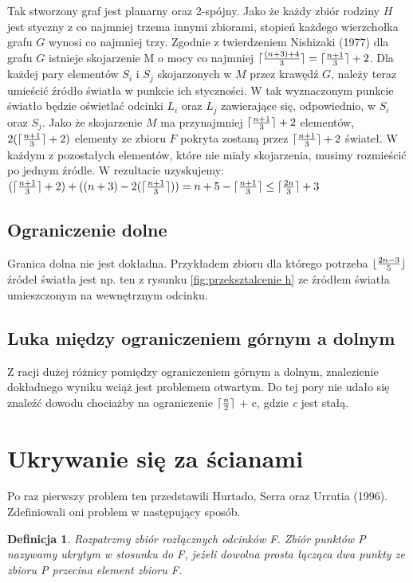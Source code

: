 \documentclass[brudnopis]{xmgr}
\DeclarePairedDelimiter\ceil{\lceil}{\rceil}
\DeclarePairedDelimiter\floor{\lfloor}{\rfloor}
\newtheorem{Definicja}{Definicja} \theoremstyle{definition}
\begin{document}
Tak stworzony graf jest planarny oraz 2-spójny. Jako że każdy zbiór rodziny $H$ jest styczny z co najmniej trzema innymi zbiorami, stopień każdego wierzchołka grafu $G$ wynosi co najmniej trzy. Zgodnie z twierdzeniem Nishizaki (1977) dla grafu $G$ istnieje skojarzenie M o mocy co najmniej $\ceil{\frac{(n+3)+4}{3}} = \ceil{\frac{n+1}{3}}  + 2$. Dla każdej pary elementów $S_i$ i $S_j$ skojarzonych w $M$ przez krawędź $G$, należy teraz umieścić źródło światła w punkcie ich styczności. W tak wyznaczonym punkcie światło będzie oświetlać odcinki $L_i$ oraz $L_j$ zawierające się, odpowiednio, w $S_i$ oraz $S_j$. Jako że skojarzenie $M$ ma przynajmniej $\ceil{\frac{n+1}{3}} + 2$ elementów, $2(\ceil{\frac{n+1}{3}} + 2)$ elementy ze zbioru $F$ pokryta zostaną przez $\ceil{\frac{n+1}{3}} + 2$ świateł. W każdym z pozostałych elementów, które nie miały skojarzenia, musimy rozmieścić po jednym źródle. W rezultacie uzyskujemy:
$(\ceil{\frac{n+1}{3}} + 2) + ((n + 3) - 2(\ceil{\frac{n+1}{3}})) = n + 5 - \ceil{\frac{n+1}{3}} \le \ceil{\frac{2n}{3}} + 3$

\subsection{Ograniczenie dolne}
\indent Granica dolna nie jest dokładna. Przykładem zbioru dla którego potrzeba $\floor{\frac{2n-3}{5}}$ źródeł światła jest np. ten z rysunku \ref{fig:przeksztalcenie h} ze źródłem światła umieszczonym na wewnętrznym odcinku.

\subsection{Luka między ograniczeniem górnym a dolnym}
Z racji dużej różnicy pomiędzy ograniczeniem górnym a dolnym, znalezienie dokładnego wyniku wciąż jest problemem otwartym. Do tej pory nie udało się znaleźć dowodu chociażby na ograniczenie $\ceil{\frac{n}{2}}$ + c, gdzie \textit{c} jest stałą.

\section{Ukrywanie się za ścianami}
Po raz pierwszy problem ten przedstawili Hurtado, Serra oraz Urrutia (1996). Zdefiniowali oni problem w następujący sposób.

\begin{Definicja}\label{ukrywanie definicja}
 Rozpatrzmy zbiór rozłącznych odcinków F. Zbiór punktów P nazywamy \textnormal{ukrytym} w stosunku do F, jeżeli dowolna prosta łącząca dwa punkty ze zbioru P przecina element zbioru F.
\end{Definicja}
\end{document}
